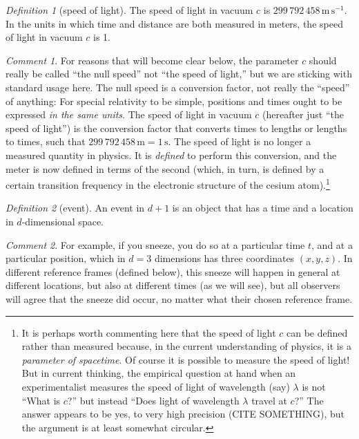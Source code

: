 \documentclass[10pt]{article}
\newcounter{par}
\theoremstyle{remark}
\newtheorem{definition}{Definition}
\theoremstyle{remark}
\newtheorem*{remark}{Comment}
\newcommand{\unit}[1]{\mathrm{#1}}
\newcommand{\m}{\unit{m}}
\newcommand{\s}{\unit{s}}
\begin{document}
\begin{definition}[speed of light]
    The speed of light in vacuum $c$ is $299\,792\,458\,\m\,\s^{-1}$.
    In the units in which time and distance are both measured in meters, the speed of light in vacuum $c$ is 1.
\end{definition}
\begin{remark}
    For reasons that will become clear below, the parameter $c$ should really be called ``the null speed'' not ``the speed of light,'' but we are sticking with standard usage here.
    The null speed is a conversion factor, not really the ``speed'' of anything:
    For special relativity to be simple, positions and times ought to be expressed \emph{in the same units}.
    The speed of light in vacuum $c$ (hereafter just ``the speed of light'') is the conversion factor that converts times to lengths or lengths to times, such that $299\,792\,458\,\m = 1\,\s$.
    The speed of light is no longer a measured quantity in physics.
    It is \emph{defined} to perform this conversion, and the meter is now defined in terms of the second (which, in turn, is defined by a certain transition frequency in the electronic structure of the cesium atom).\footnote{%
        It is perhaps worth commenting here that the speed of light $c$ can be defined rather than measured because, in the current understanding of physics, it is a \emph{parameter of spacetime}.
        Of course it is possible to measure the speed of light!
        But in current thinking, the empirical question at hand when an experimentalist measures the speed of light of wavelength (say) $\lambda$ is not ``What is $c$?'' but instead ``Does light of wavelength $\lambda$ travel at $c$?''
        The answer appears to be yes, to very high precision (CITE SOMETHING), but the argument is at least somewhat circular.}
\end{remark}

\begin{definition}[event]
    An event in $d+1$ is an object that has a time and a location in $d$-dimensional space.
\end{definition}
\begin{remark}
    For example, if you sneeze, you do so at a particular time $t$, and at a particular position, which in $d=3$ dimensions has three coordinates $(x, y, z)$.
    In different reference frames (defined below), this sneeze will happen in general at different locations, but also at different times (as we will see), but all observers will agree that the sneeze did occur, no matter what their chosen reference frame.
\end{remark}
\end{document}
